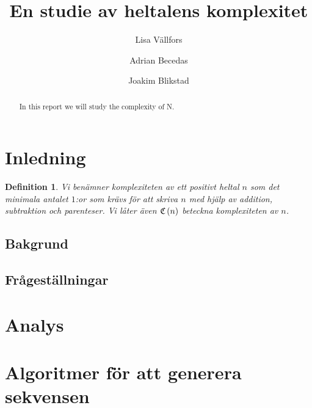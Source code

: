 \documentclass[a4paperi,titlepage,onesided,draft]{article}
\title{En studie av heltalens komplexitet}
\author{Lisa Vällfors \and Adrian Becedas \and Joakim Blikstad}
\newcommand{\C}[1]{\frak C \left( #1 \right)}
\newtheorem{definition}[theorem]{Definition}
\begin{document}
\maketitle

\begin{abstract}
    In this report we will study the complexity of N.
\end{abstract}

\tableofcontents 
\newpage

\section{Inledning}

\begin{definition}
   Vi benämner komplexiteten av ett positivt heltal $n$ som det minimala
   antalet $1$:or som krävs för att skriva $n$ med hjälp av addition,
   subtraktion och parenteser. Vi låter även $\C{n}$ beteckna komplexiteten av
   $n$. 
\end{definition}

\subsection{Bakgrund}

\subsection{Frågeställningar}


\section{Analys}

\section{Algoritmer för att generera sekvensen}
\end{document}
